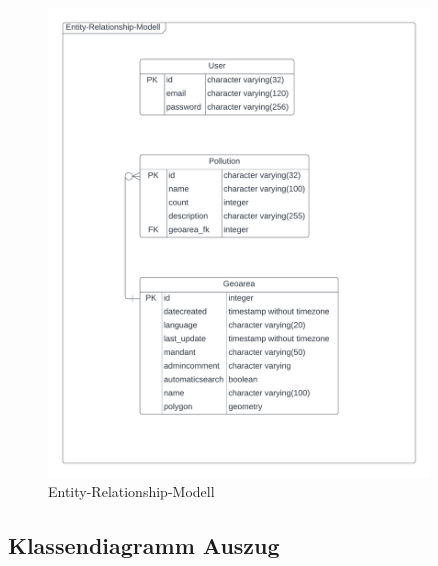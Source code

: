 \documentclass[a4paper,12pt]{article}
\begin{document}
\begin{figure}[h]
\centering
\includegraphics[width=0.9\textwidth]{bilder/Entity-Relationship-Diagram4.png}
\caption{Entity-Relationship-Modell}
\end{figure}

\clearpage
\subsection{Klassendiagramm Auszug}
\label{sec:klassendiagramm}
\end{document}
